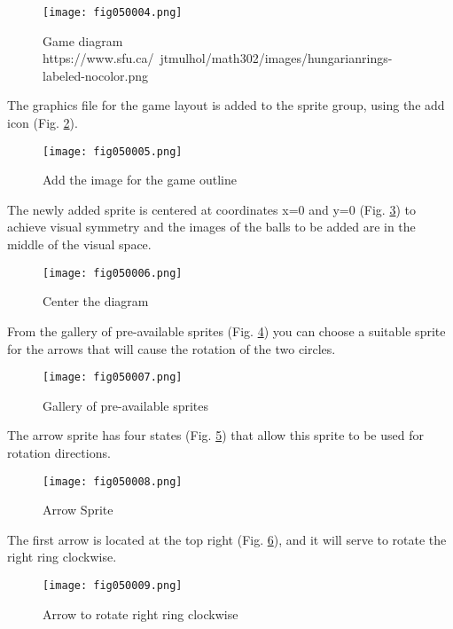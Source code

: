 \begin{figure}[H]
   \centering
   \texttt{[image: fig050004.png]}
   \caption{Game diagram \\ https://www.sfu.ca/~jtmulhol/math302/images/hungarianrings-labeled-nocolor.png}
\label{fig050004}
\end{figure}

The graphics file for the game layout is added to the sprite group, using the add icon (Fig. \ref{fig050005}).

\begin{figure}[H]
   \centering
   \texttt{[image: fig050005.png]}
   \caption{Add the image for the game outline}
\label{fig050005}
\end{figure}

The newly added sprite is centered at coordinates x=0 and y=0 (Fig. \ref{fig050006}) to achieve visual symmetry and the images of the balls to be added are in the middle of the visual space.

\begin{figure}[H]
   \centering
   \texttt{[image: fig050006.png]}
   \caption{Center the diagram}
\label{fig050006}
\end{figure}

From the gallery of pre-available sprites (Fig. \ref{fig050007}) you can choose a suitable sprite for the arrows that will cause the rotation of the two circles.

\begin{figure}[H]
   \centering
   \texttt{[image: fig050007.png]}
   \caption{Gallery of pre-available sprites}
\label{fig050007}
\end{figure}

The arrow sprite has four states (Fig. \ref{fig050008}) that allow this sprite to be used for rotation directions.

\begin{figure}[H]
   \centering
   \texttt{[image: fig050008.png]}
   \caption{Arrow Sprite}
\label{fig050008}
\end{figure}

The first arrow is located at the top right (Fig. \ref{fig050009}), and it will serve to rotate the right ring clockwise.

\begin{figure}[H]
   \centering
   \texttt{[image: fig050009.png]}
   \caption{Arrow to rotate right ring clockwise}
\label{fig050009}
\end{figure}

